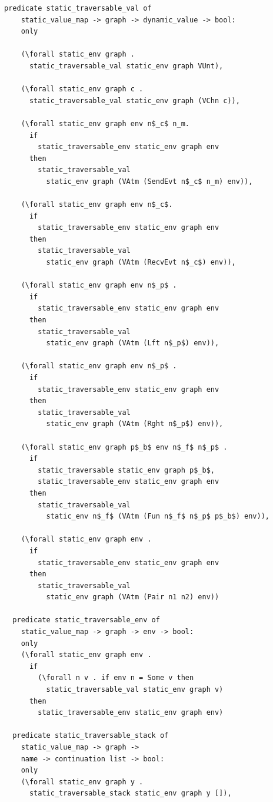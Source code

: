 \documentclass[10pt]{article}
\begin{document}
\begin{lstlisting}[language=logic, mathescape]
  predicate static_traversable_val of
    static_value_map -> graph -> dynamic_value -> bool:
    only

    (\forall static_env graph .
      static_traversable_val static_env graph VUnt), 

    (\forall static_env graph c .
      static_traversable_val static_env graph (VChn c)),

    (\forall static_env graph env n$_c$ n_m.
      if
        static_traversable_env static_env graph env 
      then 
        static_traversable_val
          static_env graph (VAtm (SendEvt n$_c$ n_m) env)),

    (\forall static_env graph env n$_c$.
      if
        static_traversable_env static_env graph env 
      then
        static_traversable_val
          static_env graph (VAtm (RecvEvt n$_c$) env)),

    (\forall static_env graph env n$_p$ .
      if
        static_traversable_env static_env graph env 
      then
        static_traversable_val
          static_env graph (VAtm (Lft n$_p$) env)),

    (\forall static_env graph env n$_p$ .
      if
        static_traversable_env static_env graph env
      then
        static_traversable_val
          static_env graph (VAtm (Rght n$_p$) env)),

    (\forall static_env graph p$_b$ env n$_f$ n$_p$ .
      if
        static_traversable static_env graph p$_b$, 
        static_traversable_env static_env graph env
      then
        static_traversable_val
          static_env n$_f$ (VAtm (Fun n$_f$ n$_p$ p$_b$) env)),

    (\forall static_env graph env . 
      if
        static_traversable_env static_env graph env
      then
        static_traversable_val
          static_env graph (VAtm (Pair n1 n2) env))

  predicate static_traversable_env of
    static_value_map -> graph -> env -> bool: 
    only 
    (\forall static_env graph env .
      if
        (\forall n v . if env n = Some v then
          static_traversable_val static_env graph v)
      then
        static_traversable_env static_env graph env) 

  predicate static_traversable_stack of
    static_value_map -> graph ->
    name -> continuation list -> bool:
    only
    (\forall static_env graph y .
      static_traversable_stack static_env graph y []),


\end{lstlisting}
\end{document}
